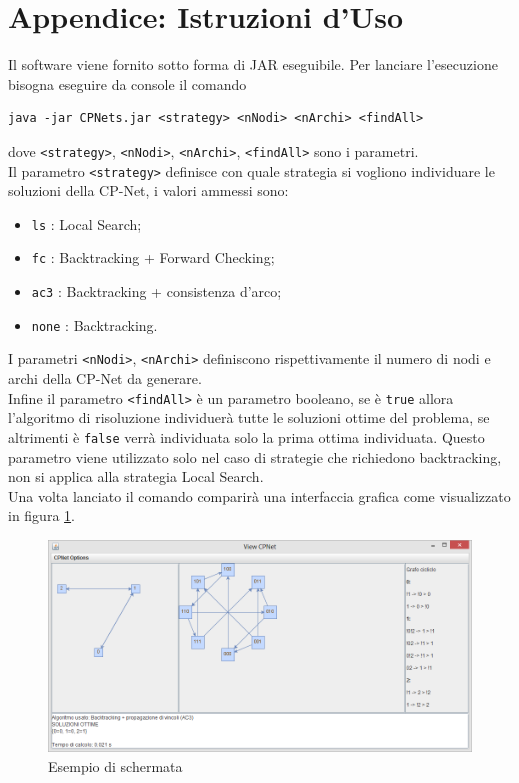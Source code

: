 \documentclass[a4paper,titlepage]{article}
\begin{document}
\section{Appendice: Istruzioni d'Uso}
Il software viene fornito sotto forma di JAR eseguibile. Per lanciare l'esecuzione bisogna eseguire da console il comando
\begin{verbatim}
java -jar CPNets.jar <strategy> <nNodi> <nArchi> <findAll>
\end{verbatim}
dove \texttt{<strategy>}, \texttt{<nNodi>}, \texttt{<nArchi>}, \texttt{<findAll>} sono i parametri.\\
Il parametro \texttt{<strategy>} definisce con quale strategia si vogliono individuare le soluzioni della CP-Net, i valori ammessi sono:
\begin{itemize}
\item  \texttt{ls} : Local Search;
\item  \texttt{fc} : Backtracking + Forward Checking;
\item  \texttt{ac3} : Backtracking + consistenza d'arco;
\item  \texttt{none} : Backtracking.
\end{itemize}
I parametri \texttt{<nNodi>}, \texttt{<nArchi>} definiscono rispettivamente il numero di nodi e archi della CP-Net da generare.\\
Infine il parametro \texttt{<findAll>} è un parametro booleano, se è \texttt{true} allora l'algoritmo di risoluzione individuerà tutte le soluzioni ottime del problema, se altrimenti è \texttt{false} verrà individuata solo la prima ottima individuata. Questo parametro viene utilizzato solo nel caso di strategie che richiedono backtracking, non si applica alla strategia Local Search.\\
Una volta lanciato il comando comparirà una interfaccia grafica come visualizzato in figura \ref{fig:1}.\\
\begin{figure}
\centering
\includegraphics[scale=0.5]{../img/screen.png}
\caption{Esempio di schermata}\label{fig:1}
\end{figure}
\end{document}

